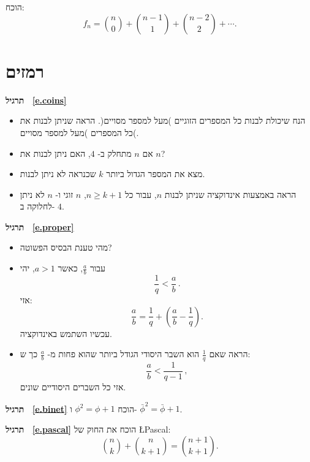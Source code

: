 \vspace*{-3ex}

\begin{exercise}\label{e.pascal}
הוכח:
\[
f_n = {n \choose 0} + {n-1 \choose 1} + {n-2 \choose 2} + \cdots.
\]
\end{exercise}

\section{%
רמזים%
}

\textbf{תרגיל
~\ref{e.coins}}
\begin{itemize}
\item
הנח שיכולת לבנות כל המספרים הזוגיים )מעל למספר מסויים(. הראה שניתן לבנות את כל המספרים )מעל למספר מסויים(.
\item 
אם
$n$
מתחלק ב-%
$4$,
האם ניתן לבנות את
$n$?
\item 
מצא את המספר הגדול ביותר 
$k$
שכנראה לא ניתן לבנות.
\item
הראה באמצעות אינדוקציה שניתן לבנות
$n$,
עבור כל
$n\geq k+1$, $n$
זוגי ו-%
$n$
לא ניתן לחלוקה ב-%
$4$.
\end{itemize}

\medskip

\textbf{תרגיל
~\ref{e.proper}}
\begin{itemize}
\item 
מהי טענת הבסיס הפשוטה?
\item 
עבור
$\frac{a}{b}$,
כאשר
$a>1$,
יהי
\[
\frac{1}{q} < \frac{a}{b}\,.
\]
אזי:
\[
\frac{a}{b} = \frac{1}{q} + \left( \frac{a}{b} - \frac{1}{q} \right).
\]
עכשיו השתמש באינדוקציה.
\item 
הראה שאם
$\frac{1}{q}$
הוא השבר היסודי הגודל ביותר שהוא פחות מ-%
$\frac{a}{b}$
כך ש:
\[
\frac{a}{b} < \frac{1}{q-1}\,,
\]
אזי כל השברים היסודיים שונים.
\end{itemize}

\textbf{תרגיל
~\ref{e.binet}} 
הוכח
$\phi^2=\phi+1$
ו-%
$\bar{\phi}^2=\bar{\phi}+1$.

\medskip

\textbf{תרגיל
~\ref{e.pascal}}
הוכח את החוק של
\L{Pascal}:
\[
{n \choose k} + {n \choose k+1} = {n+1 \choose k+1}.
\]

